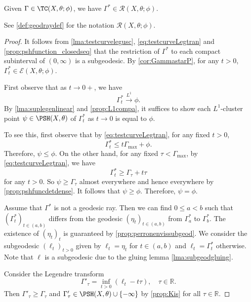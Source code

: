 \begin{lemma}\label{lma:LegsendsTCtoR}
    Given $\Gamma\in \TC(X,\theta;\phi)$, we have $\Gamma^*\in \mathcal{R}(X,\theta;\phi)$.
\end{lemma}
See \cref{def:geodraydef} for the notation $\mathcal{R}(X,\theta;\phi)$.
\begin{proof}
    It follows from \cref{lma:testcurvelegusc}, \eqref{eq:testcurveLegtran} and \cref{prop:pshfunction_closedseq} that the restriction of $\Gamma^*$ to each compact subinterval of $(0,\infty)$ is a subgeodesic. By \cref{cor:GammastarP}, for any $t>0$, $\Gamma^*_t\in \mathcal{E}(X,\theta;\phi)$.

    First observe that as $t\to 0+$, we have
    \begin{equation}\label{eq:GammatophiL1temp}
        \Gamma_t^*\xrightarrow{L^1}\phi.
    \end{equation}
    By \cref{lma:suplegenlinear} and \cref{prop:L1compa}, it suffices to show each $L^1$-cluster point $\psi\in \PSH(X,\theta)$ of $\Gamma_t^*$ as $t\to 0$ is equal to $\phi$.

    To see this, first observe that by \eqref{eq:testcurveLegtran}, for any fixed $t>0$,
    \[
        \Gamma_t^*\leq t\Gamma_{\max}+\phi.
    \]
    Therefore, $\psi\leq \phi$. On the other hand, for any fixed $\tau<\Gamma_{\max}$, by \eqref{eq:testcurveLegtran}, we have
    \[
        \Gamma^*_t\geq \Gamma_{\tau}+t\tau
    \]
    for any $t>0$. So $\psi\geq \Gamma_{\tau}$ almost everywhere and hence everywhere by \cref{prop:pshfuncdetdense}. It follows that $\psi\geq \phi$. Therefore, $\psi=\phi$.

     Assume that $\Gamma^*$ is not a geodesic ray. Then we can find $0\leq a<b$ such that $(\Gamma^*_t)_{t\in (a,b)}$ differs from the geodesic $(\eta_t)_{t\in (a,b)}$ from $\Gamma^*_a$ to $\Gamma^*_b$. The existence of $(\eta_t)_t$ is guaranteed by \cref{prop:perronenvissubgeod}.
     We consider the subgeodesic $(\ell_t)_{t>0}$ given by $\ell_t=\eta_t$ for $t\in (a,b)$ and $\ell_t=\Gamma^*_t$ otherwise. Note that $\ell$ is a subgeodesic due to the gluing lemma \cref{lma:subgeodgluing}.

     Consider the Legendre transform
    \[
        \Gamma'_{\tau}=\inf_{t>0} (\ell_t-t\tau),\quad \tau\in \mathbb{R}.
    \]
    Then $\Gamma'_{\tau}\geq \Gamma_{\tau}$ and $\Gamma'_{\tau}\in \PSH(X,\theta)\cup\{-\infty\}$ by \cref{prop:Kis} for all $\tau\in \mathbb{R}$.


\end{proof}
